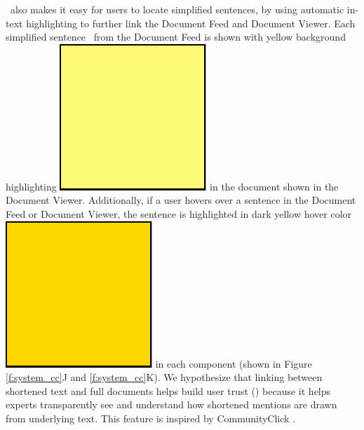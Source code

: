 \ours~also makes it easy for users to locate simplified sentences, by using {automatic in-text highlighting to further link the Document Feed and Document Viewer}.
Each simplified sentence \simplifiedsentence~from the Document Feed is shown with yellow background highlighting \includegraphics[scale=0.06]{figures/CCHighlight.pdf} in the document shown in the Document Viewer.
Additionally, if a user hovers over a sentence in the Document Feed or Document Viewer, the sentence is highlighted in dark yellow hover color \includegraphics[scale=0.06]{figures/CCHover.pdf} in each component (shown in Figure \ref{f:system_cc}J and \ref{f:system_cc}K).
We hypothesize that linking between shortened text and full documents helps build user trust (\rnoconfound) because it helps experts transparently see and understand how shortened mentions are drawn from underlying text.
This feature is inspired by CommunityClick \cite{CommunityClick}.

